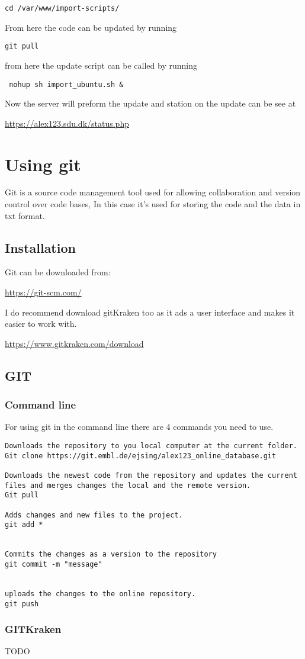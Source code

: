 \documentclass[a4paper,10pt,titlepage]{report}
\begin{document}
\begin{lstlisting}
cd /var/www/import-scripts/
\end{lstlisting}

From here the code can be updated by running


\begin{lstlisting}
git pull
\end{lstlisting}


from here the update script can be called by running

\begin{lstlisting}
 nohup sh import_ubuntu.sh &
\end{lstlisting}

Now the server will preform the update and station on the update can be see at 

\url{https://alex123.sdu.dk/status.php}

\newpage 
\section{Using git}

Git is a source code management tool used for allowing collaboration and version control over code bases, In this case it's used for storing the code and the data in txt format.

\subsection{Installation}
Git can be downloaded from:

\url{https://git-scm.com/}

I do recommend download gitKraken too as it ads a user interface and makes it easier to work with.

\url{https://www.gitkraken.com/download}


\subsection{GIT}

\subsubsection{Command line}

For using git in the command line there are 4 commands you need to use.
\begin{lstlisting}
Downloads the repository to you local computer at the current folder.
Git clone https://git.embl.de/ejsing/alex123_online_database.git

Downloads the newest code from the repository and updates the current files and merges changes the local and the remote version.
Git pull

Adds changes and new files to the project.
git add *


Commits the changes as a version to the repository
git commit -m "message"


uploads the changes to the online repository.
git push

\end{lstlisting}

\subsubsection{GITKraken}

TODO
\end{document}
